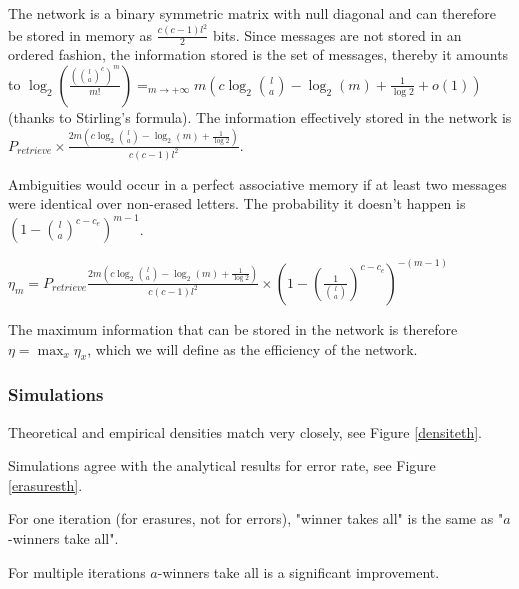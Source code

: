 \documentclass[english,11pt,twocolumn]{IEEEtran}
\theoremstyle{definition}
\begin{document}
	The network is a binary symmetric matrix with null diagonal and can therefore be stored in memory as $\frac{c(c-1) l^2}{2}$ bits. Since messages are not stored in an ordered fashion, the information stored is the set of messages, thereby it amounts to $\log_2(\frac{({l \choose a}^c)^m}{m!}) \mathop{=}_{m \rightarrow +\infty} m(c \log_2{l \choose a } - \log_2(m) + \frac{1}{\log 2} + o(1)) $ (thanks to  Stirling's formula). The information effectively stored in the network is $P_{retrieve} \times  \frac{2m \left(c \log_2{l \choose a } - \log_2(m) + \frac{1}{\log 2} \right)}{c(c-1)l^2}$.
	
	Ambiguities would occur in a perfect associative memory if at least two messages were identical over non-erased letters. The probability it doesn't happen is $ (1-{l \choose a}^{c - c_e})^{m-1}$.
	
	
	$\eta_m = P_{retrieve}  \frac{2 m\left(c \log_2{l \choose a } - \log_2(m) + \frac{1}{\log 2} \right)}{c(c-1)l^2} \times (1-(\frac{1}{{l \choose a}})^{c - c_e})^{-(m-1)}$
	
	The maximum information that can be stored in the network is therefore $\eta = \max_x \eta_x $, which we will define as the efficiency of the network.
	
	\subsubsection{Simulations}
		Theoretical and empirical densities match very closely, see Figure \ref{densiteth}. %
		
		
		
		Simulations agree with the analytical results for error rate, see Figure \ref{erasuresth}.
	

	For one iteration (for erasures, not for errors), "winner takes all" is the same as "$a$-winners take all".
	
	For multiple iterations $a$-winners take all is a significant improvement.
	
	
\end{document}
